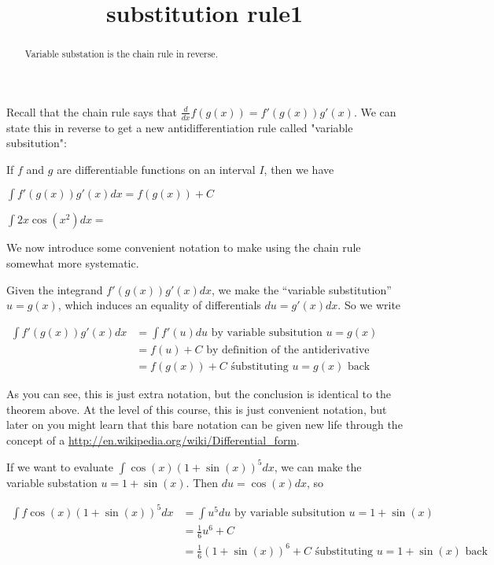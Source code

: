 \documentclass{ximera}
\title{substitution rule1}
\begin{document}
\begin{abstract}
  Variable substation is the chain rule in reverse.
\end{abstract}

\maketitle


Recall that the chain rule says that $\frac{d}{dx} f(g(x)) = f'(g(x))g'(x)$.  We can state this in reverse to get a new antidifferentiation rule called "variable subsitution":

\begin{theorem}
If $f$ and $g$ are differentiable functions on an interval $I$, then we have

$\displaystyle\int f'(g(x))g'(x)dx = f(g(x))+C$
\end{theorem}

\begin{question}
	$\int 2x\cos(x^2) dx=$
\end{question}

We now introduce some convenient notation to make using the chain rule somewhat more systematic.

Given the integrand $f'(g(x))g'(x)dx$, we make the ``variable substitution'' $ u = g(x)$, which induces an equality of differentials $du = g'(x)dx$.  So we write

$\begin{align*}
	\displaystyle \int f'(g(x))g'(x) dx &= \displaystyle \int f'(u) du \text{ by variable subsitution \(u=g(x)\)}\\
	&=f(u)+C \text{ by definition of the antiderivative}\\
	&=f(g(x)) +C \text{ \' substituting \(u=g(x)\) back}
\end{align*}$

As you can see, this is just extra notation, but the conclusion is identical to the theorem above.  At the level of this course, this is just convenient notation, but later on you might learn that this bare notation can be given new life through the concept of a \href{differential form}{http://en.wikipedia.org/wiki/Differential_form}.

\begin{example}
If we want to evaluate $\displaystyle \int \cos(x)(1+\sin(x))^5 dx$, we can make the variable substation $u = 1+\sin(x)$.  Then $du=\cos(x)dx$, so

$\begin{align*}
	\displaystyle \int f\cos(x)(1+\sin(x))^5 dx &= \displaystyle \int u^5 du \text{ by variable subsitution \(u=1+\sin(x)\)}\\
	&=\frac{1}{6}u^6+C\\
	&=\frac{1}{6}(1+\sin(x))^6 +C \text{ \' substituting \(u=1+\sin(x)\) back}
\end{align*}$

\end{example}
\end{document}
